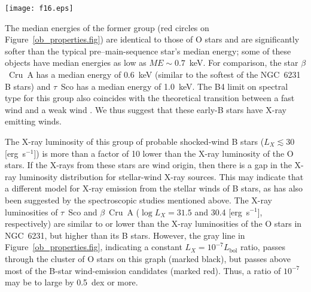 \documentclass[twocolumn,tighten]{aastex61}
\begin{document}
\begin{figure*}[t]
\centering
\texttt{[image: f16.eps]} 
\caption{Scatter plots showing spectral type, X-ray luminosity, and X-ray median energy for O and B stars in NGC~6231. The three combinations of variables are $L_X$ vs.\ $ME$ (upper-left panel), $L_X$ vs.\ spectral type (upper-right panel), and spectral type vs.\ $ME$ (lower-left panel). X-ray detected O and B stars are shown as circles, while undetected B stars are shown as arrows (upper limits) or tic marks. The three clusters identified with the normal mixture model are shown by the gray ellipses. The most likely classification of each source is indicate by its color on the plot: black circles for ``O-star wind'' sources, open circles for ``Lindroos binary'' sources, and red circles for ``B-star wind'' sources. 
On the $L_X$ vs.\ spectral type plot, the dotted line shows a constant $L_X$--$L_\mathrm{bol}$ ratio for main-sequence OB stars.
\label{ob_properties.fig}}
\end{figure*}


The median energies of the former group (red circles on Figure~\ref{ob_properties.fig}) are identical to those of O stars and are significantly softer than the typical pre--main-sequence star's median energy; some of these objects have median energies as low as $ME\sim0.7$~keV. For comparison, the star $\beta$~Cru~A has a median energy of $0.6$~keV (similar to the softest of the NGC~6231 B stars) and $\tau$~Sco has a median energy of 1.0~keV. The B4 limit on spectral type for this group also coincides with the theoretical transition between a fast wind and a weak wind \citep[][and references therein]{2005ApJS..160..557S}. We thus suggest that these early-B stars have X-ray emitting winds. 

The X-ray luminosity of this group of probable shocked-wind B stars ($L_X\lesssim30$ [erg~s$^{-1}$]) is more than a factor of 10 lower than the X-ray luminosity of the O stars. If the X-rays from these stars are wind origin, then there is a gap in the X-ray luminosity distribution for stellar-wind X-ray sources. This may indicate that a different model for X-ray emission from the stellar winds of B stars, as has also been suggested by the spectroscopic studies mentioned above. The X-ray luminosities of $\tau$~Sco and $\beta$~Cru~A ($\log L_X=31.5$ and 30.4 [erg~s$^{-1}$], respectively) are similar to or lower than the X-ray luminosities of the O stars in NGC~6231, but higher than its B stars. However, the gray line in Figure~\ref{ob_properties.fig}, indicating a constant $L_X=10^{-7} L_\mathrm{bol}$ ratio, passes through the cluster of O stars on this graph (marked black), but passes above most of the B-star wind-emission candidates (marked red). 
Thus, a ratio of $10^{-7}$ may be to large by 0.5~dex or more.
\end{document}
